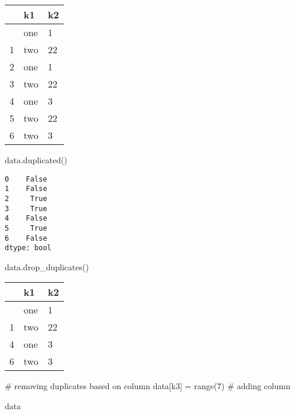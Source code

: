 \documentclass[
  letterpaper,
  DIV=11,
  numbers=noendperiod]{scrreprt}
\newenvironment{Shaded}{\begin{snugshade}}{\end{snugshade}}
\newcommand{\BuiltInTok}[1]{\textcolor[rgb]{0.00,0.23,0.31}{#1}}
\newcommand{\CommentTok}[1]{\textcolor[rgb]{0.37,0.37,0.37}{#1}}
\newcommand{\DecValTok}[1]{\textcolor[rgb]{0.68,0.00,0.00}{#1}}
\newcommand{\NormalTok}[1]{\textcolor[rgb]{0.00,0.23,0.31}{#1}}
\newcommand{\OperatorTok}[1]{\textcolor[rgb]{0.37,0.37,0.37}{#1}}
\newcommand{\StringTok}[1]{\textcolor[rgb]{0.13,0.47,0.30}{#1}}
\begin{document}
\begin{longtable}[]{@{}lll@{}}
\toprule\noalign{}
& k1 & k2 \\
\midrule\noalign{}
\endhead
\bottomrule\noalign{}
\endlastfoot
0 & one & 1 \\
1 & two & 22 \\
2 & one & 1 \\
3 & two & 22 \\
4 & one & 3 \\
5 & two & 22 \\
6 & two & 3 \\
\end{longtable}

\begin{Shaded}
\begin{Highlighting}[]
\NormalTok{data.duplicated()}
\end{Highlighting}
\end{Shaded}

\begin{verbatim}
0    False
1    False
2     True
3     True
4    False
5     True
6    False
dtype: bool
\end{verbatim}

\begin{Shaded}
\begin{Highlighting}[]
\NormalTok{data.drop\_duplicates()}
\end{Highlighting}
\end{Shaded}

\begin{longtable}[]{@{}lll@{}}
\toprule\noalign{}
& k1 & k2 \\
\midrule\noalign{}
\endhead
\bottomrule\noalign{}
\endlastfoot
0 & one & 1 \\
1 & two & 22 \\
4 & one & 3 \\
6 & two & 3 \\
\end{longtable}

\begin{Shaded}
\begin{Highlighting}[]
\CommentTok{\# removing duplicates based on column}
\NormalTok{data[}\StringTok{\textquotesingle{}k3\textquotesingle{}}\NormalTok{] }\OperatorTok{=} \BuiltInTok{range}\NormalTok{(}\DecValTok{7}\NormalTok{)   }\CommentTok{\# adding column}
\end{Highlighting}
\end{Shaded}

\begin{Shaded}
\begin{Highlighting}[]
\NormalTok{data}
\end{Highlighting}
\end{Shaded}
\end{document}
